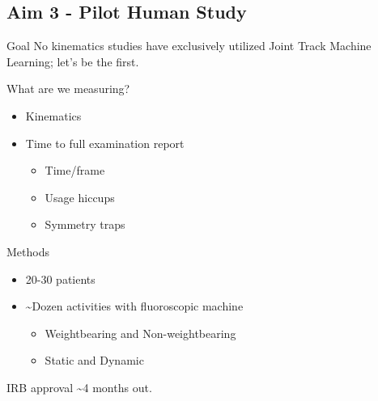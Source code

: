 \documentclass[presentation, aspectratio=1610]{beamer}
\begin{document}
\subsection{Aim 3 - Pilot Human Study}
\label{sec:orgf58ba0d}
\begin{frame}[label={sec:org1697639}]{Goal}
No kinematics studies have exclusively utilized Joint Track Machine Learning; let's be the first.

What are we measuring?
\begin{itemize}
\item Kinematics
\item Time to full examination report
\begin{itemize}
\item Time/frame
\item Usage hiccups
\item Symmetry traps
\end{itemize}
\end{itemize}
\end{frame}

\begin{frame}[label={sec:orgbc47612}]{Methods}
\begin{itemize}
\item 20-30 patients
\item \textasciitilde{}Dozen activities with fluoroscopic machine
\begin{itemize}
\item Weightbearing and Non-weightbearing
\item Static and Dynamic
\end{itemize}
\end{itemize}

IRB approval \textasciitilde{}4 months out.
\end{frame}
\end{document}
